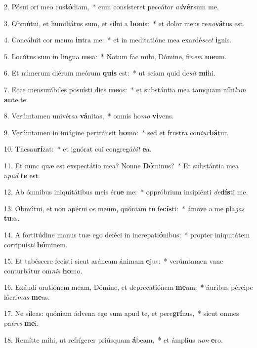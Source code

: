2. Pósui ori meo cus\textbf{tó}diam,~*  cum consísteret peccátor \textit{ad}\textbf{vér}sum me.\

3. Obmútui, et humiliátus sum, et sílui a \textbf{bo}nis:~*  et dolor meus re\textit{no}\textbf{vá}tus est.\

4. Concáluit cor meum \textbf{in}tra me:~*  et in meditatióne mea exardé\textit{scet} \textbf{i}gnis.\

5. Locútus sum in lingua \textbf{me}a:~*  Notum fac mihi, Dómine, fi\textit{nem} \textbf{me}um.\

6. Et númerum diérum meórum \textbf{quis} est:~*  ut sciam quid de\textit{sit} \textbf{mi}hi.\

7. Ecce mensurábiles posuísti dies \textbf{me}os:~*  et substántia mea tamquam níhi\textit{lum} \textbf{an}te te.\

8. Verúmtamen univérsa \textbf{vá}nitas,~*  omnis ho\textit{mo} \textbf{vi}vens.\

9. Verúmtamen in imágine pertránsit \textbf{ho}mo:~*  sed et frustra con\textit{tur}\textbf{bá}tur.\

10. Thesau\textbf{rí}zat:~*  et ignórat cui congregá\textit{bit} \textbf{e}a.\

11. Et nunc quæ est exspectátio mea? Nonne \textbf{Dó}minus?~*  Et substántia mea a\textit{pud} \textbf{te} est.\

12. Ab ómnibus iniquitátibus meis éru\textbf{e} me:~*  oppróbrium insipiénti \textit{de}\textbf{dís}ti me.\

13. Obmútui, et non apérui os meum, quóniam tu fe\textbf{cís}ti:~*  ámove a me pla\textit{gas} \textbf{tu}as.\

14. A fortitúdine manus tuæ ego deféci in increpati\textbf{ó}nibus:~*  propter iniquitátem corripuís\textit{ti} \textbf{hó}minem.\

15. Et tabéscere fecísti sicut aráneam ánimam \textbf{e}jus:~*  verúmtamen vane conturbátur om\textit{nis} \textbf{ho}mo.\

16. Exáudi oratiónem meam, Dómine, et deprecatiónem \textbf{me}am:~*  áuribus pércipe lácri\textit{mas} \textbf{me}as.\

17. Ne síleas: quóniam ádvena ego sum apud te, et pere\textbf{grí}nus,~*  sicut omnes pa\textit{tres} \textbf{me}i.\

18. Remítte mihi, ut refrígerer priúsquam \textbf{á}beam,~*  et ámplius \textit{non} \textbf{e}ro.\

